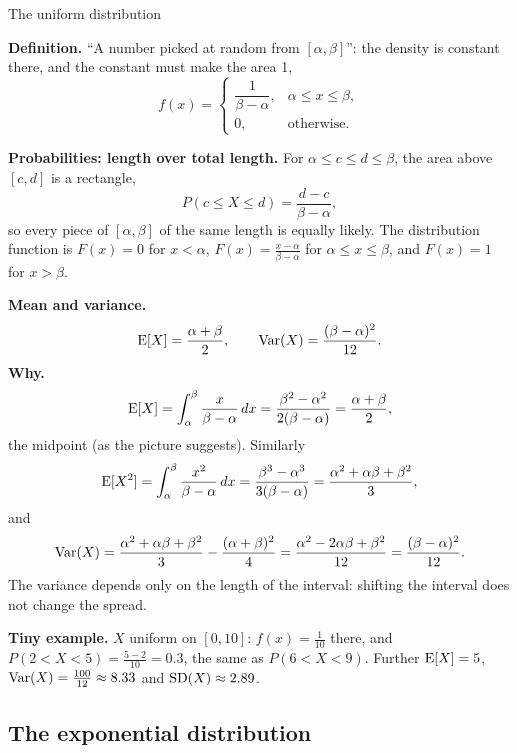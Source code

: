 \begin{key}{The uniform distribution}
	\setlength{\parskip}{5pt}
	\begin{minipage}[t]{.5\linewidth}
		\textbf{Definition.} ``A number picked at random from
		$[\alpha,\beta]$'': the density is constant there, and the constant
		must make the area 1,
		\[ f(x)=\begin{cases}\dfrac{1}{\beta-\alpha}, & \alpha\le x\le\beta,\\[2mm]
				0, & \text{otherwise.}\end{cases} \]
	\end{minipage}\hfill
	\begin{minipage}[t]{.46\linewidth}
		\centering\vspace{-2mm}
		\figuniform
	\end{minipage}

	\textbf{Probabilities: length over total length.} For
	$\alpha\le c\le d\le\beta$, the area above $[c,d]$ is a rectangle,
	\[ P(c\le X\le d)=\frac{d-c}{\beta-\alpha}, \]
	so every piece of $[\alpha,\beta]$ of the same length is equally likely.
	The distribution function is $F(x)=0$ for $x<\alpha$,
	$F(x)=\frac{x-\alpha}{\beta-\alpha}$ for $\alpha\le x\le\beta$, and
	$F(x)=1$ for $x>\beta$.

	\textbf{Mean and variance.}
	\[ \operatorname{E}[X]=\frac{\alpha+\beta}{2},\qquad \operatorname{Var}(X)=\frac{(\beta-\alpha)^2}{12}. \]
	\textbf{Why.}
	\[ \operatorname{E}[X]=\int_\alpha^\beta\frac{x}{\beta-\alpha}\,dx
		=\frac{\beta^2-\alpha^2}{2(\beta-\alpha)}=\frac{\alpha+\beta}{2}, \]
	the midpoint (as the picture suggests). Similarly
	\[ \operatorname{E}[X^2]=\int_\alpha^\beta\frac{x^2}{\beta-\alpha}\,dx
		=\frac{\beta^3-\alpha^3}{3(\beta-\alpha)}
		=\frac{\alpha^2+\alpha\beta+\beta^2}{3}, \]
	and
	\[ \operatorname{Var}(X)=\frac{\alpha^2+\alpha\beta+\beta^2}{3}-\frac{(\alpha+\beta)^2}{4}
		=\frac{\alpha^2-2\alpha\beta+\beta^2}{12}=\frac{(\beta-\alpha)^2}{12}. \]
	The variance depends only on the length of the interval: shifting the
	interval does not change the spread.

	\textbf{Tiny example.} $X$ uniform on $[0,10]$: $f(x)=\frac1{10}$ there,
	and $P(2<X<5)=\frac{5-2}{10}=0.3$, the same as $P(6<X<9)$. Further
	$\operatorname{E}[X]=5$, $\operatorname{Var}(X)=\frac{100}{12}\approx8.33$ and
	$\operatorname{SD}(X)\approx2.89$.
\end{key}


\subsection*{The exponential distribution}

